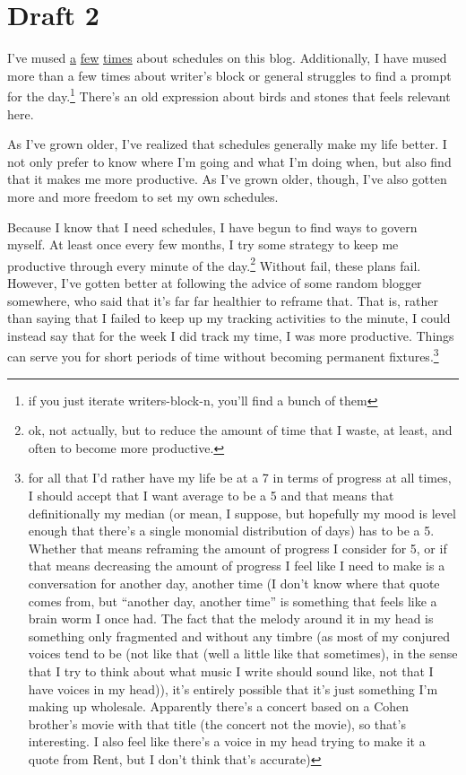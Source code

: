 \documentclass[12pt]{article}[titlepage]
\newcommand{\say}[1]{``#1''}
\renewcommand{\,}{\textsuperscript{,}}
\begin{document}
\section{Draft 2}
I've mused \href{schedules.html}{a} \href{meta-schedules.html}{few} \href{schedules-2.html}{times} about schedules on this blog.
Additionally, I have mused more than a few times about writer's block or general struggles to find a prompt for the day.\footnote{if you just iterate writers-block-n, you'll find a bunch of them}
There's an old expression about birds and stones that feels relevant here.

As I've grown older, I've realized that schedules generally make my life better.
I not only prefer to know where I'm going and what I'm doing when, but also find that it makes me more productive.
As I've grown older, though, I've also gotten more and more freedom to set my own schedules.

Because I know that I need schedules, I have begun to find ways to govern myself.
At least once every few months, I try some strategy to keep me productive through every minute of the day.\footnote{ok, not actually, but to reduce the amount of time that I waste, at least, and often to become more productive.}
Without fail, these plans fail.
However, I've gotten better at following the advice of some random blogger somewhere, who said that it's far far healthier to reframe that.
That is, rather than saying that I failed to keep up my tracking activities to the minute, I could instead say that for the week I did track my time, I was more productive.
Things can serve you for short periods of time without becoming permanent fixtures.\footnote{for all that I'd rather have my life be at a 7 in terms of progress at all times, I should accept that I want average to be a 5 and that means that definitionally my median (or mean, I suppose, but hopefully my mood is level enough that there's a single monomial distribution of days) has to be a 5. Whether that means reframing the amount of progress I consider for 5, or if that means decreasing the amount of progress I feel like I need to make is a conversation for another day, another time (I don't know where that quote comes from, but \say{another day, another time} is something that feels like a brain worm I once had. The fact that the melody around it in my head is something only fragmented and without any timbre (as most of my conjured voices tend to be (not like that (well a little like that sometimes), in the sense that I try to think about what music I write should sound like, not that I have voices in my head)), it's entirely possible that it's just something I'm making up wholesale. Apparently there's a concert based on a Cohen brother's movie with that title (the concert not the movie), so that's interesting. I also feel like there's a voice in my head trying to make it a quote from Rent, but I don't think that's accurate)}
\end{document}
